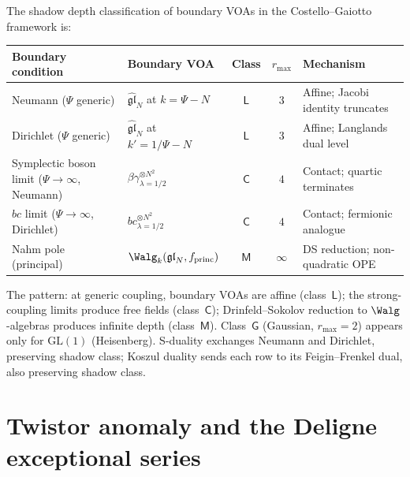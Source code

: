 \begin{remark}
\label{rem:boundary-voa-shadow-depth-classification}
The shadow depth classification of boundary VOAs in the
Costello--Gaiotto framework is:
\begin{center}
\renewcommand{\arraystretch}{1.25}
\small
\begin{tabular}{@{}l@{\;\;}l@{\;\;}c@{\;\;}c@{\;\;}l@{}}
\textbf{Boundary condition}
 & \textbf{Boundary VOA}
 & \textbf{Class}
 & $r_{\max}$
 & \textbf{Mechanism} \\
\midrule
Neumann ($\Psi$ generic)
 & $\widehat{\mathfrak{gl}}_N$ at $k = \Psi - N$
 & $\mathsf{L}$
 & $3$
 & Affine; Jacobi identity truncates \\
Dirichlet ($\Psi$ generic)
 & $\widehat{\mathfrak{gl}}_N$ at $k' = 1/\Psi - N$
 & $\mathsf{L}$
 & $3$
 & Affine; Langlands dual level \\
Symplectic boson limit ($\Psi\to\infty$, Neumann)
 & $\beta\gamma^{\otimes N^2}_{\lambda=1/2}$
 & $\mathsf{C}$
 & $4$
 & Contact; quartic terminates \\
$bc$ limit ($\Psi\to\infty$, Dirichlet)
 & $bc^{\otimes N^2}_{\lambda=1/2}$
 & $\mathsf{C}$
 & $4$
 & Contact; fermionic analogue \\
Nahm pole (principal)
 & $\Walg_k(\mathfrak{gl}_N, f_{\mathrm{princ}})$
 & $\mathsf{M}$
 & $\infty$
 & DS reduction; non-quadratic OPE
\end{tabular}
\end{center}
The pattern: at generic coupling, boundary VOAs are affine
(class~$\mathsf{L}$); the strong-coupling limits produce free
fields (class~$\mathsf{C}$); Drinfeld--Sokolov reduction to
$\Walg$-algebras produces infinite depth (class~$\mathsf{M}$).
Class~$\mathsf{G}$ (Gaussian, $r_{\max} = 2$) appears only
for $\mathrm{GL}(1)$ (Heisenberg).
S-duality exchanges Neumann and Dirichlet, preserving shadow
class; Koszul duality sends each row to its Feigin--Frenkel
dual, also preserving shadow class.
\end{remark}

\section{Twistor anomaly and the Deligne exceptional series}
\label{sec:ht-twistor-deligne}

